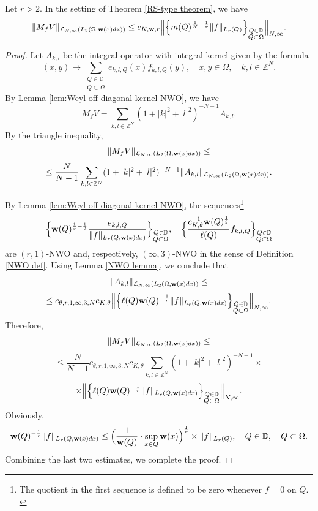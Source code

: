 \documentclass{amsart}
\begin{document}
\begin{lemma}\label{RS intermediate estimate} Let $r>2.$ In the setting of Theorem \ref{RS-type theorem}, we have
$$\|M_fV\|_{\mathcal{L}_{N,\infty}(L_2(\Omega,{\bf w}(x)dx))}\leq c_{K,{\bf w},r}\Big\|\Big\{m(Q)^{\frac1N-\frac1r}\|f\|_{L_r(Q)}\Big\}_{\substack{Q\in\mathbb{D}\\ Q\subset\Omega}}
\Big\|_{N,\infty}.$$
\end{lemma}
\begin{proof} Let $A_{k,l}$ be the integral operator with integral kernel given by the formula
$$(x,y)\to\sum_{\substack{Q\in\mathbb{D}\\ Q\subset\Omega}}e_{k,l,Q}(x)f_{k,l,Q}(y),\quad x,y\in\Omega,\quad k,l\in\mathbb{Z}^N.$$
By Lemma \ref{lem:Weyl-off-diagonal-kernel-NWO}, we have
$$M_fV=\sum_{k,l\in\mathbb{Z}^N}(1+|k|^2+|l|^2)^{-N-1}A_{k,l}.$$
By the triangle inequality,
$$\|M_fV\|_{\mathcal{L}_{N,\infty}(L_2(\Omega,{\bf w}(x)dx))}\leq$$
$$\leq \frac{N}{N-1}\sum_{k,l\in\mathbb{Z}^N}(1+|k|^2+|l|^2)^{-N-1} \|A_{k,l}\|_{\mathcal{L}_{N,\infty}(L_2(\Omega,{\bf w}(x)dx))}.$$

By Lemma \ref{lem:Weyl-off-diagonal-kernel-NWO}, the sequences\footnote{The quotient in the first sequence is defined to be zero whenever $f=0$ on $Q.$}
$$\Big\{{\bf w}(Q)^{\frac1r-\frac12}\frac{e_{k,l,Q}}{\|f\|_{L_r(Q,{\bf w}(x)dx)}}\Big\}_{\substack{Q\in\mathbb{D}\\ Q\subset\Omega}},\quad \Big\{\frac{c_{K,\theta}^{-1}{\bf w}(Q)^{\frac12}}{\ell(Q)}f_{k,l,Q}\Big\}_{\substack{Q\in\mathbb{D}\\ Q\subset\Omega}}$$
are $(r,1)$-NWO and, respectively, $(\infty,3)$-NWO in the sense of Definition \ref{NWO def}. Using Lemma \ref{NWO lemma}, we conclude that
$$\|A_{k,l}\|_{\mathcal{L}_{N,\infty}(L_2(\Omega,{\bf w}(x)dx))}\leq$$
$$\leq c_{\theta,r,1,\infty,3,N}c_{K,\theta}\Big\|\Big\{\ell(Q){\bf w}(Q)^{-\frac1r}\|f\|_{L_r(Q,{\bf w}(x)dx)}\Big\}_{\substack{Q\in\mathbb{D}\\ Q\subset\Omega}}\Big\|_{N,\infty}.$$
Therefore,
$$\|M_fV\|_{\mathcal{L}_{N,\infty}(L_2(\Omega,{\bf w}(x)dx))}\leq$$
$$\leq \frac{N}{N-1}c_{\theta,r,1,\infty,3,N}c_{K,\theta}\sum_{k,l\in\mathbb{Z}^N}(1+|k|^2+|l|^2)^{-N-1}\times$$
$$\times \Big\|\Big\{\ell(Q){\bf w}(Q)^{-\frac1r}\|f\|_{L_r(Q,{\bf w}(x)dx)}\Big\}_{\substack{Q\in\mathbb{D}\\ Q\subset\Omega}}\Big\|_{N,\infty}.$$
Obviously,
$${\bf w}(Q)^{-\frac1r}\|f\|_{L_r(Q,{\bf w}(x)dx)}\leq \Big(\frac1{{\bf w}(Q)}\cdot\sup_{x\in Q}{\bf w}(x)\Big)^{\frac1r}\times \|f\|_{L_r(Q)},\quad Q\in\mathbb{D},\quad Q\subset\Omega.$$
Combining the last two estimates, we complete the proof.
\end{proof}
\end{document}
